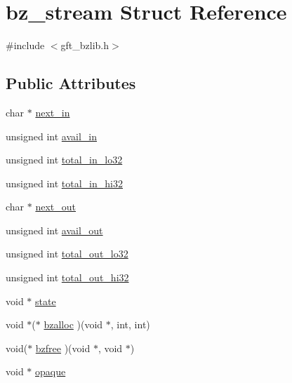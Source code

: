 \hypertarget{structbz__stream}{\section{bz\-\_\-stream Struct Reference}
\label{structbz__stream}
}


{\ttfamily \#include $<$gft\-\_\-bzlib.\-h$>$}

\subsection*{Public Attributes}
\begin{DoxyCompactItemize}
\item 
char $\ast$ \hyperlink{structbz__stream_aa4a76b5c671cc4092ad7417f2731b894}{next\-\_\-in}
\item 
unsigned int \hyperlink{structbz__stream_a3b4296261f93965fc477277c410603af}{avail\-\_\-in}
\item 
unsigned int \hyperlink{structbz__stream_aacacdc7f753d7eab8652592bd15dbe6e}{total\-\_\-in\-\_\-lo32}
\item 
unsigned int \hyperlink{structbz__stream_af5833cfbe5e07a89c9f33783f323c218}{total\-\_\-in\-\_\-hi32}
\item 
char $\ast$ \hyperlink{structbz__stream_ad27d0acafb3b84aada276b157e9aef04}{next\-\_\-out}
\item 
unsigned int \hyperlink{structbz__stream_a749a8dd37243c6b76f81de5cd2a24e2e}{avail\-\_\-out}
\item 
unsigned int \hyperlink{structbz__stream_a7befd6f6ace94f7df3aac07ad48f944b}{total\-\_\-out\-\_\-lo32}
\item 
unsigned int \hyperlink{structbz__stream_a8906ddf3e4fcc6963ef6680157647001}{total\-\_\-out\-\_\-hi32}
\item 
void $\ast$ \hyperlink{structbz__stream_a7b976d082aba4d851eea25a308d96ee8}{state}
\item 
void $\ast$($\ast$ \hyperlink{structbz__stream_ac3032f7dc55a481047e436892ac5199d}{bzalloc} )(void $\ast$, int, int)
\item 
void($\ast$ \hyperlink{structbz__stream_a71c2bc381f011bebd32462975c4b75cb}{bzfree} )(void $\ast$, void $\ast$)
\item 
void $\ast$ \hyperlink{structbz__stream_a8e000913c058c83abd1ec96c6aef302a}{opaque}
\end{DoxyCompactItemize}



